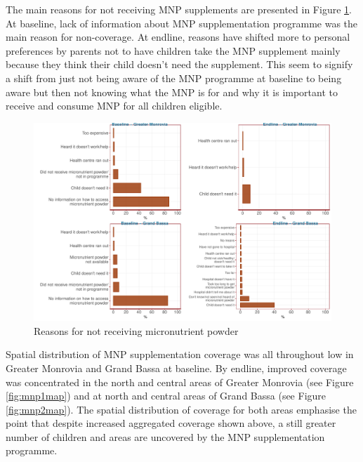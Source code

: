 \documentclass[12pt,a4paper]{article}
\begin{document}
The main reasons for not receiving MNP supplements are presented in Figure \ref{fig:mnp2plot}. At baseline, lack of information about MNP supplementation programme was the main reason for non-coverage. At endline, reasons have shifted more to personal preferences by parents not to have children take the MNP supplement mainly because they think their child doesn't need the supplement. This seem to signify a shift from just not being aware of the MNP programme at baseline to being aware but then not knowing what the MNP is for and why it is important to receive and consume MNP for all children eligible.

\begin{figure}[H]

{\centering \includegraphics{liberiaCoverageFinalReport_files/figure-latex/mnp2plot-1} 

}

\caption{Reasons for not receiving micronutrient powder}\label{fig:mnp2plot}
\end{figure}

Spatial distribution of MNP supplementation coverage was all throughout low in Greater Monrovia and Grand Bassa at baseline. By endline, improved coverage was concentrated in the north and central areas of Greater Monrovia (see Figure \ref{fig:mnp1map}) and at north and central areas of Grand Bassa (see Figure \ref{fig:mnp2map}). The spatial distribution of coverage for both areas emphasise the point that despite increased aggregated coverage shown above, a still greater number of children and areas are uncovered by the MNP supplementation programme.
\end{document}
